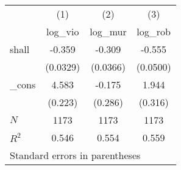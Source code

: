 \begin{tabular}{l*{3}{c}}
\toprule
            &\multicolumn{1}{c}{(1)}&\multicolumn{1}{c}{(2)}&\multicolumn{1}{c}{(3)}\\
            &\multicolumn{1}{c}{log\_vio}&\multicolumn{1}{c}{log\_mur}&\multicolumn{1}{c}{log\_rob}\\
\midrule
shall       &      -0.359&      -0.309&      -0.555\\
            &    (0.0329)&    (0.0366)&    (0.0500)\\
\addlinespace
\_cons      &       4.583&      -0.175&       1.944\\
            &     (0.223)&     (0.286)&     (0.316)\\
\midrule
\(N\)       &        1173&        1173&        1173\\
\(R^{2}\)   &       0.546&       0.554&       0.559\\
\bottomrule
\multicolumn{4}{l}{\footnotesize Standard errors in parentheses}\\
\end{tabular}
